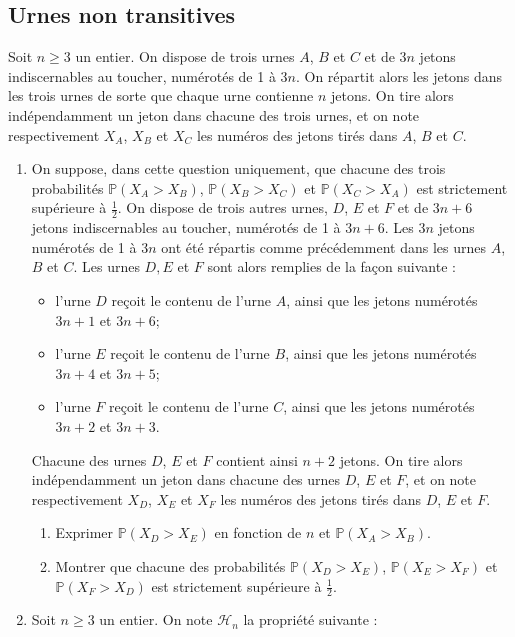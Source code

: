 \documentclass[landscape,twocolumn,leqno,a4paper,10pt]{report} %
\newcommand\n{\noindent}
\renewcommand{\geq}{\geqslant}
\newcommand{\Prob}{\mathbb{P}}
\begin{document}
\subsection{Urnes non transitives}

\n Soit $n \geq 3$ un entier. On dispose de trois urnes $A$, $B$ et $C$ et de $3 n$ jetons indiscernables au toucher, numérotés de 1 à $3 n$. On répartit alors les jetons dans les trois urnes de sorte que chaque urne contienne $n$ jetons. On tire alors indépendamment un jeton dans chacune des trois urnes, et on note respectivement $X_{A}$, $X_{B}$ et $X_{C}$ les numéros des jetons tirés dans $A$, $B$ et $C$.

\begin{enumerate}
	\item On suppose, dans cette question uniquement, que chacune des trois probabilités $\Prob\left(X_{A}>X_{B}\right)$, $\Prob\left(X_{B}>X_{C}\right)$ et $\Prob\left(X_{C}>X_{A}\right)$ est strictement supérieure à $\frac{1}{2}$.
	On dispose de trois autres urnes, $D$, $E$ et $F$ et de $3 n+6$ jetons indiscernables au toucher, numérotés de 1 à $3 n+6$. Les $3 n$ jetons numérotés de 1 à $3 n$ ont été répartis comme précédemment dans les urnes $A$, $B$ et $C$. Les urnes $D, E$ et $F$ sont alors remplies de la façon suivante :
	\begin{itemize}
		\item l'urne $D$ reçoit le contenu de l'urne $A$, ainsi que les jetons numérotés $3 n+1$ et $3 n+6$;
		\item l'urne $E$ reçoit le contenu de l'urne $B$, ainsi que les jetons numérotés $3 n+4$ et $3 n+5$;
		\item l'urne $F$ reçoit le contenu de l'urne $C$, ainsi que les jetons numérotés $3 n+2$ et $3 n+3$.
	\end{itemize}
	Chacune des urnes $D$, $E$ et $F$ contient ainsi $n+2$ jetons. On tire alors indépendamment un jeton dans chacune des urnes $D$, $E$ et $F$, et on note respectivement $X_{D}$, $X_{E}$ et $X_{F}$ les numéros des jetons tirés dans $D$, $E$ et $F$.
	\begin{enumerate}
		\item Exprimer $\Prob\left(X_{D}>X_{E}\right)$ en fonction de $n$ et $\Prob\left(X_{A}>X_{B}\right)$.
		\item Montrer que chacune des probabilités $\Prob\left(X_{D}>X_{E}\right)$, $\Prob\left(X_{E}>X_{F}\right)$ et $\Prob\left(X_{F}>X_{D}\right)$ est strictement supérieure à $\frac{1}{2}$.
	\end{enumerate}
	\item Soit $n \geq 3$ un entier. On note $\mathscr{H}_{n}$ la propriété suivante :\\

\end{enumerate}
\end{document}
